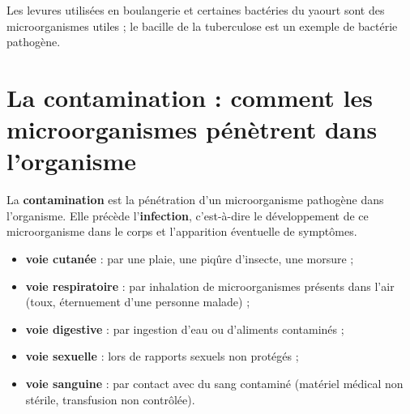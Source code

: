 \begin{exemple}
Les levures utilisées en boulangerie et certaines bactéries du yaourt sont des
microorganismes utiles ; le bacille de la tuberculose est un exemple de bactérie
pathogène.
\end{exemple}

\section{La contamination : comment les microorganismes pénètrent dans l'organisme}

\begin{definition}[Contamination]
La \textbf{contamination} est la pénétration d'un microorganisme pathogène dans
l'organisme. Elle précède l'\textbf{infection}, c'est-à-dire le développement de ce
microorganisme dans le corps et l'apparition éventuelle de symptômes.
\end{definition}

\begin{propriete}
\begin{itemize}
\item \textbf{voie cutanée} : par une plaie, une piqûre d'insecte, une morsure ;
\item \textbf{voie respiratoire} : par inhalation de microorganismes présents dans
l'air (toux, éternuement d'une personne malade) ;
\item \textbf{voie digestive} : par ingestion d'eau ou d'aliments contaminés ;
\item \textbf{voie sexuelle} : lors de rapports sexuels non protégés ;
\item \textbf{voie sanguine} : par contact avec du sang contaminé (matériel médical
non stérile, transfusion non contrôlée).
\end{itemize}
\end{propriete}

\begin{illus}
\end{illus}

